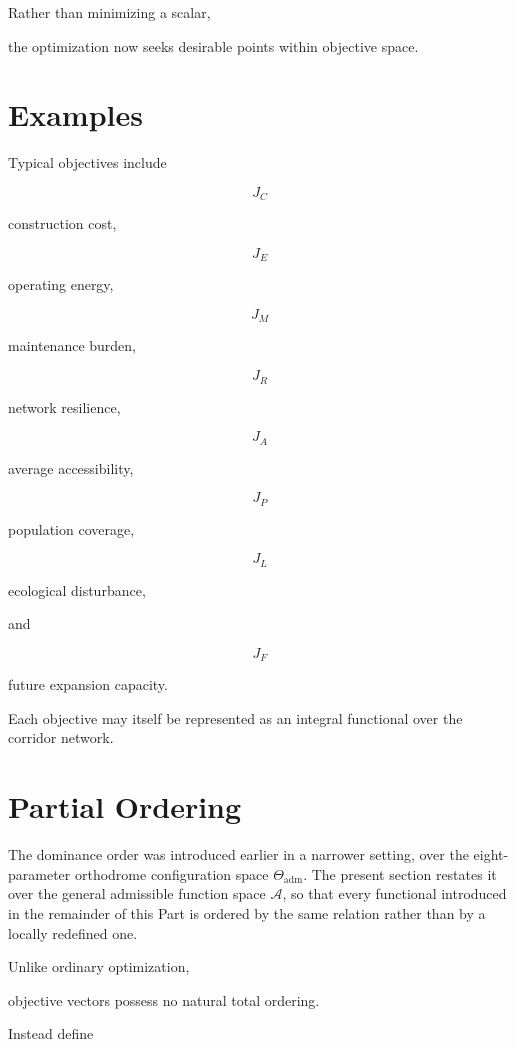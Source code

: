 \documentclass[11pt,fleqn]{book}
\numberwithin{equation}{chapter}
\theoremstyle{plain}
\theoremstyle{definition}
\theoremstyle{remark}
\begin{document}
Rather than minimizing a scalar,

the optimization now seeks desirable points within objective space.


\section{Examples}

Typical objectives include

\[
J_C
\]

construction cost,

\[
J_E
\]

operating energy,

\[
J_M
\]

maintenance burden,

\[
J_R
\]

network resilience,

\[
J_A
\]

average accessibility,

\[
J_P
\]

population coverage,

\[
J_L
\]

ecological disturbance,

and

\[
J_F
\]

future expansion capacity.

Each objective may itself be represented as an integral functional over
the corridor network.


\section{Partial Ordering}

The dominance order was introduced earlier in a narrower setting, over
the eight-parameter orthodrome configuration space
\(\Theta_{\mathrm{adm}}\). The present section restates it over the
general admissible function space \(\mathcal A\), so that every
functional introduced in the remainder of this Part is ordered by the
same relation rather than by a locally redefined one.

Unlike ordinary optimization,

objective vectors possess no natural total ordering.

Instead define
\end{document}

